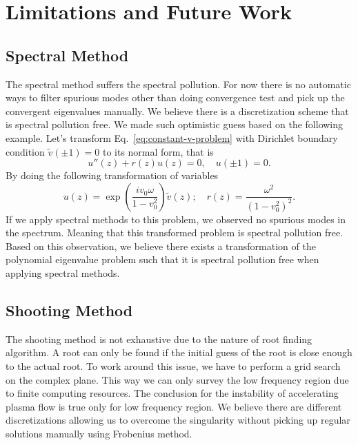 \section{Limitations and Future Work}
\subsection{Spectral Method}
The spectral method suffers the spectral pollution. For now there is no automatic ways to filter spurious modes other than doing convergence test and pick up the convergent eigenvalues manually. We believe there is a discretization scheme that is spectral pollution free. We made such optimistic guess based on the following example. Let's transform Eq.~\ref{eq:constant-v-problem} with Dirichlet boundary condition $\tilde{v}(\pm 1) = 0$ to its normal form, that is
\begin{equation}
	u''(z) + r(z)u(z) = 0, \quad u(\pm 1) = 0.
\end{equation}
By doing the following transformation of variables
\begin{equation}
	u(z) = \exp\left(\frac{iv_0\omega}{1-v_0^2}\right)\tilde{v}(z); \quad
	r(z) = \frac{\omega^2}{(1-v_0^2)^2}.
\end{equation}
If we apply spectral methods to this problem, we observed no spurious modes in the spectrum. Meaning that this transformed problem is spectral pollution free. Based on this observation, we believe there exists a transformation of the polynomial eigenvalue problem such that it is spectral pollution free when applying spectral methods.

\subsection{Shooting Method}
The shooting method is not exhaustive due to the nature of root finding algorithm. A root can only be found if the initial guess of the root is close enough to the actual root. To work around this issue, we have to perform a grid search on the complex plane. This way we can only survey the low frequency region due to finite computing resources. The conclusion for the instability of accelerating plasma flow is true only for low frequency region. We believe there are different discretizations allowing us to overcome the singularity without picking up regular solutions manually using Frobenius method.

